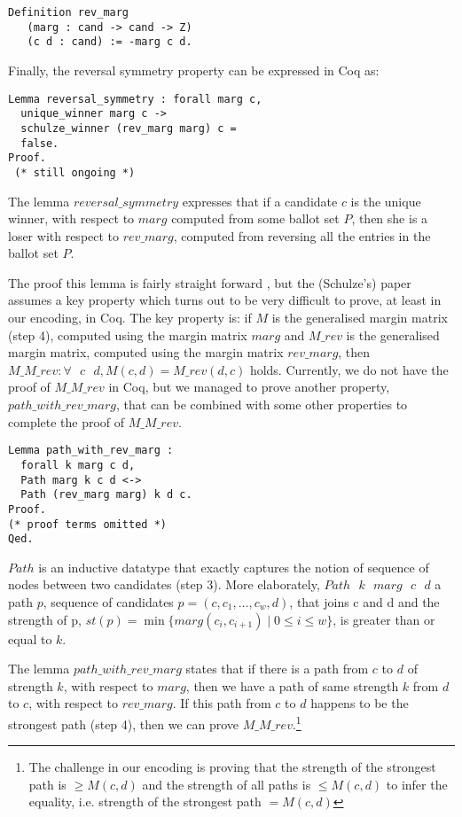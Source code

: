 \documentclass[compsoc,conference,a4paper,10pt,times]{IEEEtran}
\begin{document}
\begin{verbatim}
Definition rev_marg 
   (marg : cand -> cand -> Z) 
   (c d : cand) := -marg c d.
\end{verbatim}

\noindent


Finally, the reversal symmetry property can be expressed in Coq as: 
\begin{verbatim}
Lemma reversal_symmetry : forall marg c, 
  unique_winner marg c ->
  schulze_winner (rev_marg marg) c = 
  false.
Proof. 
 (* still ongoing *)
\end{verbatim}

\noindent
The lemma $reversal\_symmetry$ expresses that if a candidate $c$ is the unique 
winner, with respect to $marg$ computed from some ballot set $P$, then she is 
a loser with respect to $rev\_marg$, computed from reversing all the entries 
in the ballot set $P$.

\noindent
The proof this lemma is fairly straight forward \cite{Schulze:2011:NMC}, but 
the (Schulze's) paper assumes a key property which turns out to be very difficult to prove, 
at least in our encoding, in Coq. The key property is: if $M$ 
is the generalised margin 
matrix (step 4), computed using the margin matrix $marg$ and $M\_rev$ is the generalised 
margin matrix, computed using the margin matrix $rev\_marg$, then 
$M\_M\_rev: \forall \text{ } c \text{ } d,  M(c, d) = M\_rev (d, c)$ holds. Currently, 
we do not have the proof of $M\_M\_rev$ in Coq, but we managed to prove 
another property, $path\_with\_rev\_marg$, that can be combined with 
some other properties to complete the proof of $M\_M\_rev$. 

\begin{verbatim}
Lemma path_with_rev_marg :
  forall k marg c d,
  Path marg k c d <->  
  Path (rev_marg marg) k d c.
Proof.
(* proof terms omitted *)  
Qed.
\end{verbatim}

\noindent
$Path$ is an inductive datatype that exactly captures the notion of 
sequence of nodes between two candidates (step 3). More elaborately, 
$Path \text{ }k \text{ }marg \text{ }c \text{ }d$ a path $p$, sequence of candidates 
$p= (c,c_{1}, \dots ,c_{w},d)$, that joins c and d and the strength of 
p, $st(p) =  \min \lbrace marg (c_i, c_{i+1}) \mid 0 
\leq i \leq w \rbrace$, is greater than or equal to $k$. 

\noindent
The lemma $path\_with\_rev\_marg$ states that if there is a path from 
$c$ to $d$ of strength $k$, with respect to $marg$, then we have 
a path of same strength $k$ from $d$ to $c$, with respect to $rev\_marg$. 
If this path from $c$ to $d$ happens to be the strongest path (step 4), 
then we can prove $M\_M\_rev$.\footnote{The challenge in our encoding 
is proving that the strength of the strongest path is $\geq  M(c, d)$ and 
the strength of all paths is $\leq M(c, d)$ to infer the equality, 
i.e. strength of the strongest path $= M(c, d)$}



\end{document}

